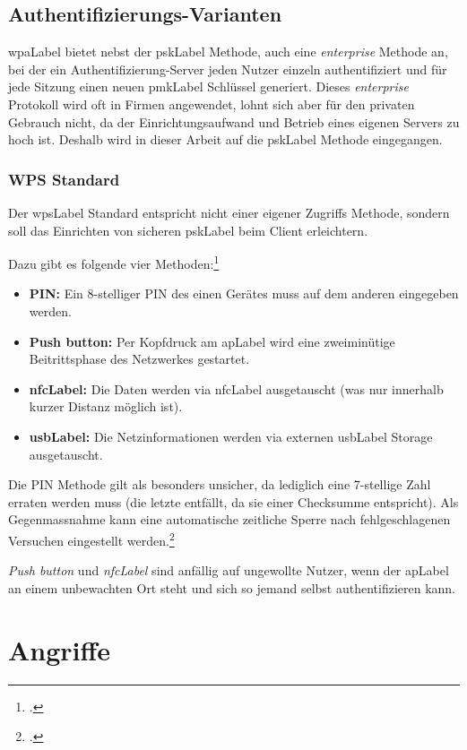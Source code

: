 \subsection{Authentifizierungs-Varianten}
\gls{wpaLabel} bietet nebst der \gls{pskLabel} Methode, auch eine \textit{enterprise} Methode an, bei der ein Authentifizierung-Server jeden Nutzer einzeln authentifiziert und für jede Sitzung einen neuen \gls{pmkLabel} Schlüssel generiert.
Dieses \textit{enterprise} Protokoll wird oft in Firmen angewendet, lohnt sich aber für den privaten Gebrauch nicht, da der Einrichtungsaufwand und Betrieb eines eigenen Servers zu hoch ist.
Deshalb wird in dieser Arbeit auf die \gls{pskLabel} Methode eingegangen.

\subsubsection{WPS Standard}
Der \gls{wpsLabel} Standard entspricht nicht einer eigener Zugriffs Methode, sondern soll das Einrichten von sicheren \gls{pskLabel} beim Client erleichtern.

Dazu gibt es folgende vier Methoden:\footcite{Wi-Fi_Protected_Setup_-_Wikipedia_the_free_encyclopedia_2015-04-10}
\begin{itemize}
	\item \textbf{PIN:} Ein 8-stelliger PIN des einen Gerätes muss auf dem anderen eingegeben werden.
	\item \textbf{Push button:} Per Kopfdruck am \gls{apLabel} wird eine zweiminütige Beitrittsphase des Netzwerkes gestartet.
	\item \textbf{\gls{nfcLabel}:} Die Daten werden via \gls{nfcLabel} ausgetauscht (was nur innerhalb kurzer Distanz möglich ist).
	\item \textbf{\gls{usbLabel}:} Die Netzinformationen werden via externen \gls{usbLabel} Storage ausgetauscht.
\end{itemize}

Die PIN Methode gilt als besonders unsicher, da lediglich eine 7-stellige Zahl erraten werden muss (die letzte entfällt, da sie einer Checksumme entspricht).
Als Gegenmassnahme kann eine automatische zeitliche Sperre nach fehlgeschlagenen Versuchen eingestellt werden.\footcite{viehboeck_wps_2015-04-10}

\textit{Push button} und \textit{\gls{nfcLabel}} sind anfällig auf ungewollte Nutzer, wenn der \gls{apLabel} an einem unbewachten Ort steht und sich so jemand selbst authentifizieren kann.



\section{Angriffe}


